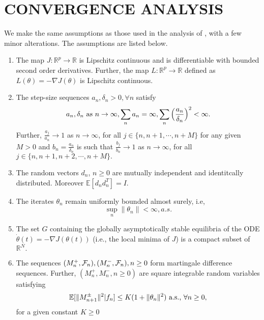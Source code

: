\section{CONVERGENCE ANALYSIS}
\label{sec:convergenceresults}
We make the same assumptions as those used in the analysis of \cite{spall}, with a 
few minor alterations. The assumptions are listed below.

\begin{enumerate}[label= \textbf{A\arabic*}.]
 \item The map $J:\mathbb{R}^p \rightarrow \mathbb{R}$ is Lipschitz continuous and 
 is differentiable with bounded second order derivatives. Further, 
 the map $L:\mathbb{R}^p \rightarrow \mathbb{R}$ defined as 
 $L(\theta)=-\nabla J(\theta)$ is Lipschitz continuous.
 \item The step-size sequences $a_n, \delta_n >0, \forall n $  satisfy
 \begin{equation*}\label{stepsizes}
 a_n,\delta_n \text{ as } n \rightarrow \infty, \sum_na_n=\infty,
 \sum_n \Big{(}\frac{a_n}{\delta_n}\Big{)}^2<\infty.
 \end{equation*}
 Further, $\frac{a_j}{a_n}\rightarrow 1$ as $n\rightarrow \infty$, for all
 $j \in \{n,n+1,\cdots,n+M\}$ for any given $M>0$ and $b_n=\frac{a_n}{\delta_n}$ is 
 such that $\frac{b_j}{b_n}\rightarrow 1$ as $n\rightarrow \infty$, for all
 $j \in \{n,n+1,n+2,\cdots,n+M\}.$

 \item The random vectors $d_n$, $n\geq0$ are mutually independent and identitcally
 distributed. Moreover $\mathbb{E}[d_nd_n^T]=I.$
 
 \item The iterates $\theta_n$ remain uniformly bounded almost surely, i.e,
 $$ \sup_n\|\theta_n\|<\infty, a.s.$$

 \item The set $G$ containing the globally asymptotically stable equilibria of the 
 ODE $\dot{\theta}(t)=-\nabla J(\theta(t)) $ (i.e., the local minima of $J$)
 is a compact subset of $\mathbb{R}^N.$
 
 \item The sequences $(M_{n}^{+},\mathcal{F}_n),(M_{n}^{-},\mathcal{F}_n), n\geq0 $ form martingale difference sequences.
 Further, $(M_{n}^{+},M_{n}^{-},n\geq0)$ are square integrable random variables satisfying
 $$\mathbb{E}[\|M_{n+1}^{\pm}\|^2|f_n]\leq K(1+\|\theta_n\|^2) \text{ a.s., } \forall n\geq0,$$
 for a given constant $K \geq 0$
 
\end{enumerate}
